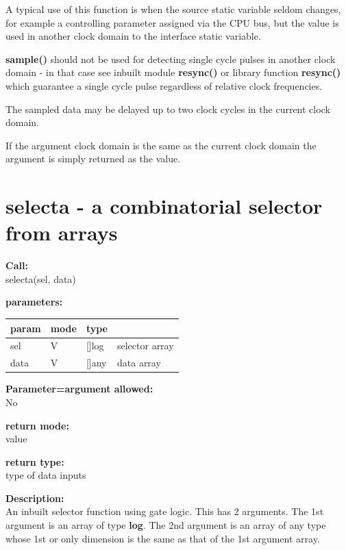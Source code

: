         A typical use of this function is when the source static
        variable seldom changes, for example a controlling
        parameter assigned via the CPU bus, but the value is used
        in another clock domain to the interface static variable.
  
        {\bf sample()} should not be used for detecting single cycle pulses in
        another clock domain - in that case see inbuilt module {\bf resync()}
         or library function {\bf resync()}  which
        guarantee a single cycle pulse regardless of relative clock frequencies.

        The sampled data may be delayed up to two clock cycles in
        the current clock domain.
        
        If the argument clock domain is the same as the current clock domain
        the argument is simply returned as the value.



    \section{selecta - a combinatorial selector from arrays}\label{sec:ifselecta}

        {\bf Call:} \\
        selecta(sel, data)
        
        {\bf parameters:} \\
        \begin{tabular}{| l | l | l | l |}
        \hline
        param  & mode & type & \\
        \hline \hline
        sel  & V & []log & selector array \\ \hline
        data & V & []any & data array     \\ \hline
        \end{tabular}
        
        {\bf Parameter=argument allowed:} \\
        No
        
        {\bf return mode:} \\
        value

        {\bf return type:} \\
        type of data inputs
        
        {\bf Description:} \\
        An inbuilt selector function using gate logic.
        This has 2 arguments. The 1st argument is an array
        of type {\bf log}. The 2nd argument is an array of any type
        whose 1st or only dimension is the same as that of the 1st
        argument array.
        
